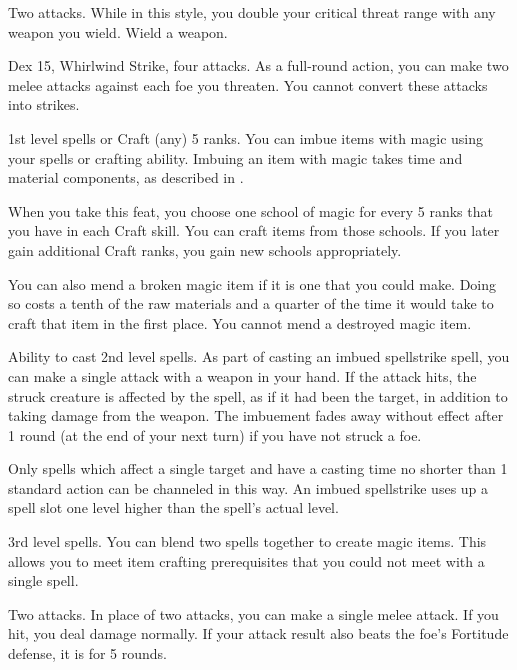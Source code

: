 \featpre Two attacks.
\featben While in this style, you double your critical threat range with any weapon you wield.
\stylereq Wield a weapon.

\featpres Dex 15, Whirlwind Strike, four attacks.
\featben As a full-round action, you can make two melee attacks against each foe you threaten. You cannot convert these attacks into strikes.

\featpre 1st level spells or Craft (any) 5 ranks.
\featben You can imbue items with magic using your spells or crafting ability.
Imbuing an item with magic takes time and material components, as described in .

When you take this feat, you choose one school of magic for every 5 ranks that you have in each Craft skill.
You can craft items from those schools.
If you later gain additional Craft ranks, you gain new schools appropriately.

You can also mend a broken magic item if it is one that you could make.
Doing so costs a tenth of the raw materials and a quarter of the time it would take to craft that item in the first place.
You cannot mend a destroyed magic item.

\featpre Ability to cast 2nd level spells.
\featben As part of casting an imbued spellstrike spell, you can make a single attack with a weapon in your hand.
If the attack hits, the struck creature is affected by the spell, as if it had been the target, in addition to taking damage from the weapon.
The imbuement fades away without effect after 1 round (at the end of your next turn) if you have not struck a foe.

Only spells which affect a single target and have a casting time no shorter than 1 standard action can be channeled in this way.
An imbued spellstrike uses up a spell slot one level higher than the spell's actual level.

\featpre 3rd level spells.
\featben You can blend two spells together to create magic items.
This allows you to meet item crafting prerequisites that you could not meet with a single spell.

\featpre Two attacks.
\featben In place of two attacks, you can make a single melee attack.
If you hit, you deal damage normally.
If your attack result also beats the foe's Fortitude defense, it is \immobilized for 5 rounds.

